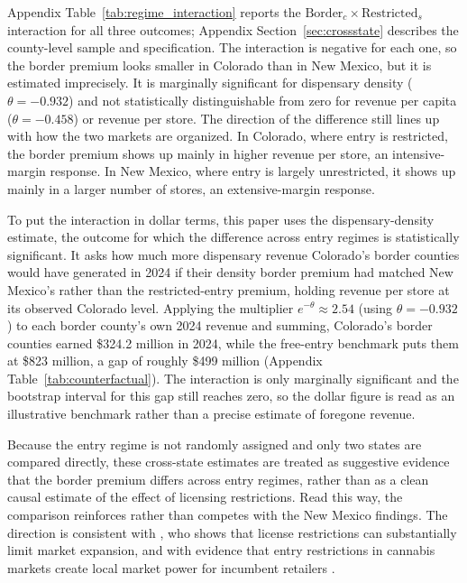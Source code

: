 \documentclass[12pt]{article}
\begin{document}
Appendix Table~\ref{tab:regime_interaction} reports the $\text{Border}_c \times \text{Restricted}_s$ interaction for all three outcomes; Appendix Section~\ref{sec:crossstate} describes the county-level sample and specification. The interaction is negative for each one, so the border premium looks smaller in Colorado than in New Mexico, but it is estimated imprecisely. It is marginally significant for dispensary density ($\theta=-0.932$) and not statistically distinguishable from zero for revenue per capita ($\theta=-0.458$) or revenue per store. The direction of the difference still lines up with how the two markets are organized. In Colorado, where entry is restricted, the border premium shows up mainly in higher revenue per store, an intensive-margin response. In New Mexico, where entry is largely unrestricted, it shows up mainly in a larger number of stores, an extensive-margin response.

To put the interaction in dollar terms, this paper uses the dispensary-density estimate, the outcome for which the difference across entry regimes is statistically significant. It asks how much more dispensary revenue Colorado's border counties would have generated in 2024 if their density border premium had matched New Mexico's rather than the restricted-entry premium, holding revenue per store at its observed Colorado level. Applying the multiplier $e^{-\theta}\approx2.54$ (using $\theta=-0.932$) to each border county's own 2024 revenue and summing, Colorado's border counties earned \$324.2 million in 2024, while the free-entry benchmark puts them at \$823 million, a gap of roughly \$499 million (Appendix Table~\ref{tab:counterfactual}). The interaction is only marginally significant and the bootstrap interval for this gap still reaches zero, so the dollar figure is read as an illustrative benchmark rather than a precise estimate of foregone revenue.

Because the entry regime is not randomly assigned and only two states are compared directly, these cross-state estimates are treated as suggestive evidence that the border premium differs across entry regimes, rather than as a clean causal estimate of the effect of licensing restrictions. Read this way, the comparison reinforces rather than competes with the New Mexico findings. The direction is consistent with \citet{thomas2019license}, who shows that license restrictions can substantially limit market expansion, and with evidence that entry restrictions in cannabis markets create local market power for incumbent retailers \citep{HollenbeckUetake2021}.
\end{document}
